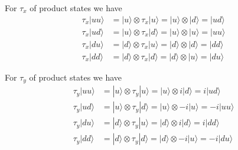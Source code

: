 For $\tau_x$ of product states we have
\begin{align*}
\tau_x|uu\rangle&=|u\rangle\otimes\tau_x|u\rangle
=|u\rangle\otimes|d\rangle=|ud\rangle
\\[1ex]
\tau_x|ud\rangle&=|u\rangle\otimes\tau_x|d\rangle
=|u\rangle\otimes|u\rangle=|uu\rangle
\\[1ex]
\tau_x|du\rangle&=|d\rangle\otimes\tau_x|u\rangle
=|d\rangle\otimes|d\rangle=|dd\rangle
\\[1ex]
\tau_x|dd\rangle&=|d\rangle\otimes\tau_x|d\rangle
=|d\rangle\otimes|u\rangle=|du\rangle
\end{align*}

For $\tau_y$ of product states we have
\begin{align*}
\tau_y|uu\rangle&=|u\rangle\otimes\tau_y|u\rangle
=|u\rangle\otimes i|d\rangle=i|ud\rangle
\\[1ex]
\tau_y|ud\rangle&=|u\rangle\otimes\tau_y|d\rangle
=|u\rangle\otimes-i|u\rangle=-i|uu\rangle
\\[1ex]
\tau_y|du\rangle&=|d\rangle\otimes\tau_y|u\rangle
=|d\rangle\otimes i|d\rangle=i|dd\rangle
\\[1ex]
\tau_y|dd\rangle&=|d\rangle\otimes\tau_y|d\rangle
=|d\rangle\otimes-i|u\rangle=-i|du\rangle
\end{align*}



